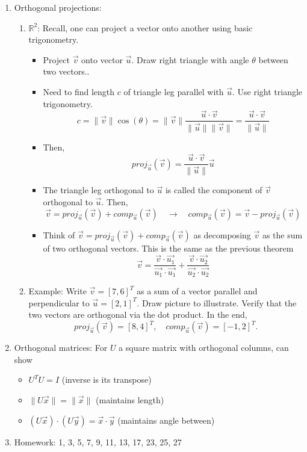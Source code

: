 \documentclass{article}
\begin{document}
\begin{enumerate}
\item Orthogonal projections:
\begin{enumerate}
\item $\mathbb{R}^2$: Recall, one can project a vector onto another using basic trigonometry.
\begin{itemize}
\item Project $\vec{v}$ onto vector $\vec{u}$. Draw right triangle with angle $\theta$ between two vectors.. 
\item Need to find length $c$ of triangle leg parallel with $\vec{u}$. Use right triangle trigonometry.
\[
c = \| \vec{v} \| \cos(\theta) = \| \vec{v} \| \frac{ \vec{u} \cdot \vec{v}}{ \|\vec{u}\| \| \vec{v} \| } = \frac{ \vec{u} \cdot \vec{v}}{ \|\vec{u}\| }
\]
\item Then,
\[
proj_{\vec{u}} (\vec{v}) =  \frac{ \vec{u} \cdot \vec{v}}{ \|\vec{u}\| } \vec{u}
\]
\item The triangle leg orthogonal to $\vec{u}$ is called the component of $\vec{v}$ orthogonal to $\vec{u}$. Then,
\[
\vec{v} = proj_{\vec{u}} (\vec{v}) + comp_{\vec{u}} (\vec{v}) \quad \rightarrow \quad 
comp_{\vec{u}} (\vec{v}) = \vec{v} - proj_{\vec{u}} (\vec{v}) 
\]
\item Think of $\vec{v} = proj_{\vec{u}} (\vec{v}) + comp_{\vec{u}} (\vec{v})$ as decomposing $\vec{v}$ as the sum of two orthogonal vectors. This is the same as the previous theorem
\[
\vec{v} = \frac{\vec{v} \cdot \vec{u_1}}{\vec{u_1} \cdot \vec{u_1}} + \frac{\vec{v} \cdot \vec{u_2}}{\vec{u_2} \cdot \vec{u_2}}
\]
\end{itemize}
\item Example: Write $\vec{v} = [7, 6]^T$ as a sum of a vector parallel and perpendicular to $\vec{u} = [2, 1]^T$. Draw picture to illustrate. Verify that the two vectors are orthogonal via the dot product. In the end,
\[
proj_{\vec{u}}(\vec{v}) = [8, 4]^T, \quad comp_{\vec{u}}(\vec{v}) = [-1, 2]^T.
\]
\end{enumerate}

\item Orthogonal matrices: For $U$ a square matrix with orthogonal columns, can show
\begin{itemize}
\item $U^T U = I$ (inverse is its transpose)
\item $\| U \vec{x} \| = \| \vec{x} \|$ (maintains length)
\item $(U\vec{x}) \cdot (U\vec{y}) = \vec{x} \cdot \vec{y}$ (maintains angle between)
\end{itemize}

\item Homework: 1, 3, 5, 7, 9, 11, 13, 17, 23, 25, 27

\end{enumerate}
\end{document}
